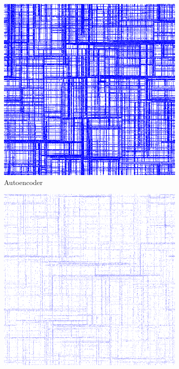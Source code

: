 \begin{figure}[htbp]
\begin{subfigure}{.48\linewidth}
  \centering
  \includegraphics[width=\linewidth]
  {figures/3904718678772130032_autoencoder/3904718678772130032_autoencoder-20.png}
  \caption{\label{fig:autoencoder_cg1}Autoencoder}
\end{subfigure}
\begin{subfigure}{.48\linewidth}
  \centering
  \includegraphics[width=\linewidth]{figures/3904718678772130032_coarsed/3904718678772130032_coarsed-20.png}

\end{subfigure}
\end{figure}

